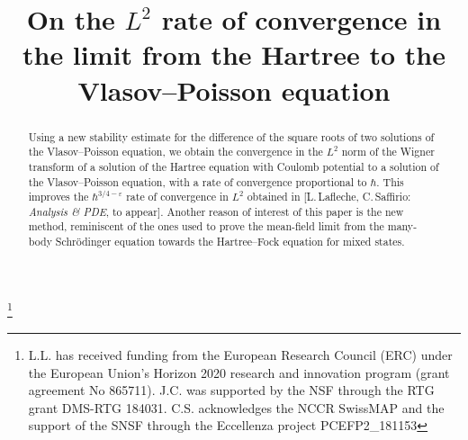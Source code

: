 \documentclass[JEP,XML,SOM,Unicode,NoEqCountersInSection,published]{cedram}
\theoremstyle{definition}
\renewcommand {\(} {\lt(}
\renewcommand {\)} {\rt)}
\begin{document}
\frontmatter
\title[On the $L^2$ rate of convergence]{On the $L^2$ rate of convergence in the limit from the Hartree to the Vlasov--Poisson equation}

\author[\initial{J.} \lastname{Chong}]{  }
\address{Department of Mathematics, The University of Texas at Austin\\ Austin, TX 78712, USA\\
\& Department of Mathematics, School of Mathematical Sciences, Peking University\\
Beijing, China}

\author[\initial{L.} \lastname{Lafleche}]{ }
\address{Department of Mathematics, The University of Texas at Austin\\ Austin, TX 78712, USA\\
\& Institut Camille Jordan, CNRS, Université Claude Bernard Lyon 1\\
43 boulevard du 11 novembre 1918, F-69622 Villeurbanne Cedex, France}

\author[\initial{C.} \lastname{Saffirio}]{ }
\address{Department of Mathematics and Computer Science, University of Basel\\
4051 Basel, Switzerland}
\urladdr{}

\thanks{L.L. has received funding from the European Research Council (ERC) under the European Union’s Horizon 2020 research and innovation program (grant agreement No 865711). J.C. was supported by the NSF through the RTG grant DMS-RTG 184031. C.S. acknowledges the NCCR SwissMAP and the support of the SNSF through the Eccellenza project PCEFP2\_181153}



\begin{abstract}
Using a new stability estimate for the difference of the square roots of two solutions of the Vlasov--Poisson equation, we obtain the convergence in the $L^2$ norm of the Wigner transform of a solution of the Hartree equation with Coulomb potential to a solution of the Vlasov--Poisson equation, with a rate of convergence proportional to $\hbar$. This improves the $\hbar^{3/4-\varepsilon}$ rate of convergence in $L^2$ obtained in [L.\,Lafleche, C.\,Saffirio: \textit{Analysis \& PDE}, to appear]. Another reason of interest of this paper is the new method, reminiscent of the ones used to prove the mean-field limit from the many-body Schrödinger equation towards the Hartree--Fock equation for mixed states.
\end{abstract}
\end{document}
